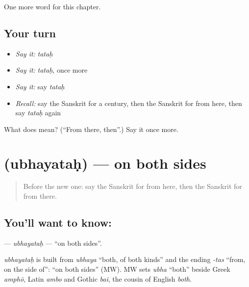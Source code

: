 \begin{grammarlens}[title={What you've built}]
One more word for this chapter.
\end{grammarlens}

\subsection*{Your turn}
\begin{itemize}
\raggedright
  \item \emph{Say it:} \emph{tataḥ}
  \item \emph{Say it:} \emph{tataḥ}, once more
  \item \emph{Say it:} say \emph{tataḥ}
  \item \emph{Recall:} say the Sanskrit for a century, then the Sanskrit for from here, then say \emph{tataḥ} again
\end{itemize}

\begin{tcolorbox}[breakable,colback=teal!4,colframe=teal!35!black,title={Before you move on}]
What does  mean? (\textquotedblleft{}From there, then\textquotedblright{}.) Say it once more.
\end{tcolorbox}
\section[\texorpdfstring{\sk{उभयतः} (ubhayataḥ)}{उभयतः (ubhayataḥ)}]{ (ubhayataḥ) — on both sides}

\label{lesson:SA-C153-ubhayatah}



\begin{quote}
Before the new one: say the Sanskrit for from here, then the Sanskrit for from there.
\end{quote}

\subsection*{You'll want to know: }
\textbf{} — \emph{ubhayataḥ} — \textquotedblleft{}on both sides\textquotedblright{}.

\begin{cousinweb}
\emph{ubhayataḥ} is built from \emph{ubhaya} \textquotedblleft{}both, of both kinds\textquotedblright{} and the ending \emph{-tas} \textquotedblleft{}from, on the side of\textquotedblright{}: \textquotedblleft{}on both sides\textquotedblright{} (MW). MW sets \emph{ubha} \textquotedblleft{}both\textquotedblright{} beside Greek \emph{amphō}, Latin \emph{ambo} and Gothic \emph{bai}, the cousin of English \emph{both}.
\end{cousinweb}

